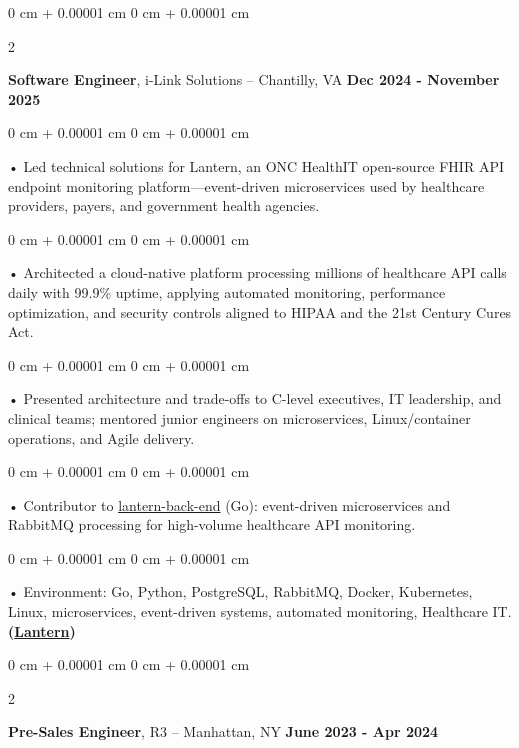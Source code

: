 \documentclass[10pt, letterpaper]{article}
\newenvironment{onecolentry}{
    \begin{adjustwidth}{
        0 cm + 0.00001 cm
    }{
        0 cm + 0.00001 cm
    }
}{
    \end{adjustwidth}
} %
\newenvironment{twocolentry}[2][]{
    \onecolentry
    \def\secondColumn{#2}
    \setcolumnwidth{\fill, 4.5 cm}
    \begin{paracol}{2}
}{
    \switchcolumn \raggedleft \secondColumn
    \end{paracol}
    \endonecolentry
} %
\begin{document}
        \vspace{0.1cm}

        \begin{twocolentry}{
            \textbf{Dec 2024 - November 2025}
        }
            \textbf{Software Engineer}, i-Link Solutions -- Chantilly, VA\end{twocolentry}


        \begin{onecolentry}
             • Led technical solutions for Lantern, an ONC HealthIT open-source FHIR API endpoint monitoring platform---event-driven microservices used by healthcare providers, payers, and government health agencies.
        \end{onecolentry}
        \begin{onecolentry}
             • Architected a cloud-native platform processing millions of healthcare API calls daily with 99.9\% uptime, applying automated monitoring, performance optimization, and security controls aligned to HIPAA and the 21st Century Cures Act.
        \end{onecolentry}
        \begin{onecolentry}
             • Presented architecture and trade-offs to C-level executives, IT leadership, and clinical teams; mentored junior engineers on microservices, Linux/container operations, and Agile delivery.
        \end{onecolentry}
        \begin{onecolentry}
             • Contributor to \href{https://github.com/onc-healthit/lantern-back-end}{lantern-back-end} (Go): event-driven microservices and RabbitMQ processing for high-volume healthcare API monitoring.
        \end{onecolentry}

        \begin{onecolentry}
             • Environment: Go, Python, PostgreSQL, RabbitMQ, Docker, Kubernetes, Linux, microservices, event-driven systems, automated monitoring, Healthcare IT. \textbf{(\href{https://lantern.healthit.gov/?tab=dashboard_tab}{Lantern})}
        \end{onecolentry}
        \vspace{0.1cm}

        \begin{twocolentry}{
            \textbf{June 2023 - Apr 2024}
        }
            \textbf{Pre-Sales Engineer}, R3 -- Manhattan, NY\end{twocolentry}
\end{document}
